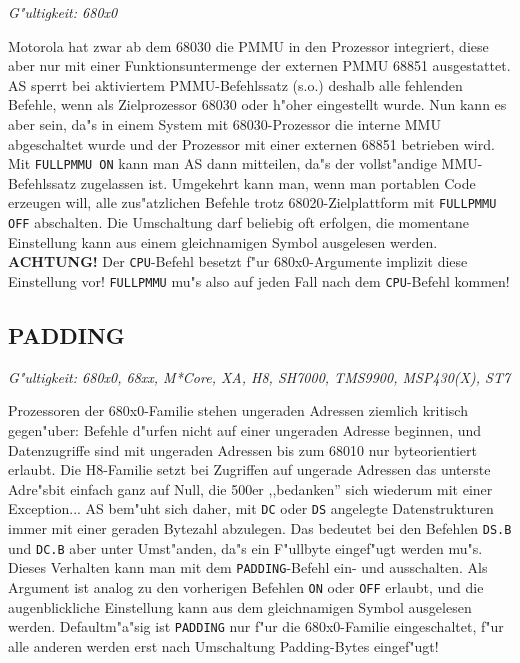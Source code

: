 \documentclass[12pt,a4paper,twoside]{report}
\makeatletter
\newcommand{\bb}[1]{{\bf #1}}
\newcommand{\tty}[1]{{\tt #1}}
\newcommand{\ttindex}[1]{\index{#1@{\tt #1}}}
\makeatother
\begin{document}
{{\em G"ultigkeit: 680x0}

Motorola hat zwar ab dem 68030 die PMMU in den Prozessor integriert,
diese aber nur mit einer Funktionsuntermenge der externen PMMU 68851
ausgestattet.  AS sperrt bei aktiviertem PMMU-Befehlssatz (s.o.) deshalb 
alle fehlenden Befehle, wenn als Zielprozessor 68030 oder h"oher
eingestellt wurde.  Nun kann es aber sein, da"s in einem System mit
68030-Prozessor die interne MMU abgeschaltet wurde und der Prozessor
mit einer externen 68851 betrieben wird.  Mit \tty{FULLPMMU ON} kann man 
AS dann mitteilen, da"s der vollst"andige MMU-Befehlssatz zugelassen 
ist.  Umgekehrt kann man, wenn man portablen Code erzeugen will, alle
zus"atzlichen Befehle trotz 68020-Zielplattform mit \tty{FULLPMMU OFF} 
abschalten.  Die Umschaltung darf beliebig oft erfolgen, die momentane
Einstellung kann aus einem gleichnamigen Symbol ausgelesen werden.
\bb{ACHTUNG!}  Der \tty{CPU}-Befehl besetzt f"ur 680x0-Argumente implizit 
diese Einstellung vor!  \tty{FULLPMMU} mu"s also auf jeden Fall nach dem 
\tty{CPU}-Befehl kommen!


\subsection{PADDING}
\ttindex{PADDING}

{\em G"ultigkeit: 680x0, 68xx, M*Core, XA, H8, SH7000, TMS9900, MSP430(X), ST7}

Prozessoren der 680x0-Familie stehen ungeraden Adressen ziemlich
kritisch gegen"uber: Befehle d"urfen nicht auf einer ungeraden Adresse
beginnen, und Datenzugriffe sind mit ungeraden Adressen bis zum
68010 nur byteorientiert erlaubt.  Die H8-Familie setzt bei Zugriffen
auf ungerade Adressen das unterste Adre"sbit einfach ganz auf Null,
die 500er ,,bedanken'' sich wiederum mit einer Exception...
AS bem"uht sich daher, mit \tty{DC} oder \tty{DS} angelegte Datenstrukturen
immer mit einer geraden Bytezahl abzulegen.  Das bedeutet bei den Befehlen
\tty{DS.B} und \tty{DC.B} aber unter Umst"anden, da"s ein F"ullbyte
eingef"ugt werden mu"s.  Dieses Verhalten kann man mit dem
\tty{PADDING}-Befehl ein- und ausschalten.  Als Argument
ist analog zu den vorherigen Befehlen \tty{ON} oder \tty{OFF} erlaubt, und
die augenblickliche Einstellung kann aus dem gleichnamigen Symbol
ausgelesen werden. Defaultm"a"sig ist \tty{PADDING} nur f"ur die
680x0-Familie eingeschaltet, f"ur alle anderen werden erst nach Umschaltung
Padding-Bytes eingef"ugt!

}
\end{document}
